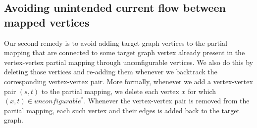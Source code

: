 \subsection{Avoiding unintended current flow between mapped vertices}
Our second remedy is to avoid adding target graph vertices to the partial mapping that are connected to some target graph vertex already present in the vertex-vertex partial mapping through unconfigurable vertices. We also do this by deleting those vertices and re-adding them whenever we backtrack the corresponding vertex-vertex pair. More formally, whenever we add a vertex-vertex pair $(s, t)$ to the partial mapping, we delete each vertex $x$ for which $(x, t) \in \mathit{unconfigurable}^*$. Whenever the vertex-vertex pair is removed from the partial mapping, each such vertex and their edges is added back to the target graph.





